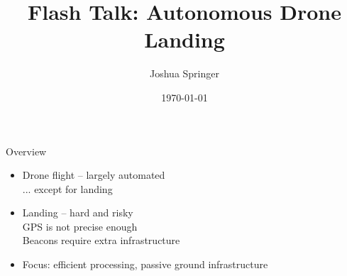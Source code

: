 \documentclass[aspectratio=169]{beamer}
\title{Flash Talk: Autonomous Drone Landing}
\author{Joshua Springer}
\institute{Reykjavík University\\Department of Computer Science}
\date{\specialdate\today}
\newif\ifpause
\newcommand{\mypause}{\ifpause \pause \fi}
\begin{document}
\maketitle

\begin{frame}{Overview}
	\begin{itemize}
		\item Drone flight -- largely automated\\\mypause... except for landing
		\mypause
		\item Landing -- hard and risky\mypause\\GPS is not precise enough\\Beacons require extra infrastructure
		\mypause
		\item Focus: efficient processing, passive ground infrastructure
	\end{itemize}
\end{frame}
\end{document}
